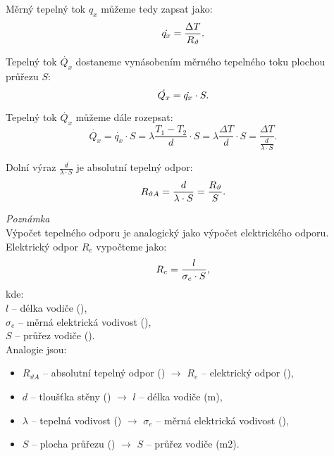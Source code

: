 \documentclass{article}
\begin{document}
Měrný tepelný tok $q_x$ můžeme tedy zapsat jako:
\begin{equation}
    \dot{q_x} = \frac{\Delta T}{R_{\vartheta}}.
    \unit{(\ueqWandMinvsq)}
\end{equation}

Tepelný tok $\dot{Q_x}$ dostaneme vynásobením měrného tepelného toku plochou průřezu $S$:
\begin{equation}
    \dot{Q_x} = \dot{q_x} \cdot S.
    \unit{(\ueqW)}
\end{equation}

Tepelný tok $\dot{Q_x}$ můžeme dále rozepsat:
$$
    \dot{Q_x} = \dot{q_x} \cdot S = \lambda \frac{T_1 - T_2}{d} \cdot S = \lambda \frac{\Delta T}{d} \cdot S = \frac{\Delta T}{\frac{d}{\lambda \cdot S}}.
$$

Dolní výraz $\frac{d}{\lambda \cdot S}$ je absolutní tepelný odpor:
\begin{equation}
    R_{\vartheta A} = \frac{d}{\lambda \cdot S} = \frac{R_{\vartheta}}{S}.
    \unit{(\ueqKandWinv)}
\end{equation}

\textit{Poznámka}\\

Výpočet tepelného odporu je analogický jako výpočet elektrického odporu. Elektrický odpor $R_e$ vypočteme jako:
\begin{equation}
    R_e = \frac{l}{\sigma_e \cdot S},
    \unit{(\ueqOHM)}
\end{equation}
kde:\\
$l$ -- délka vodiče (\ueqM),\\
$\sigma_e$ -- měrná elektrická vodivost (\ueqSIEandMinv),\\
$S$ -- průřez vodiče (\ueqMsq).\\

Analogie jsou:
\begin{itemize}
    \item $R_{\vartheta A}$ -- absolutní tepelný odpor (\ueqKandWinv) $\rightarrow$ $R_e$ -- elektrický odpor (\ueqOHM),
    \item $d$ -- tloušťka stěny (\ueqM) $\rightarrow$ $l$ -- délka vodiče (m),
    \item $\lambda$ -- tepelná vodivost (\ueqWandMinvKinv) $\rightarrow$ $\sigma_e$ -- měrná elektrická vodivost (\ueqSIEandMinv),
    \item $S$ -- plocha průřezu (\ueqMsq) $\rightarrow$ $S$ -- průřez vodiče (m2).
\end{itemize}
\end{document}
